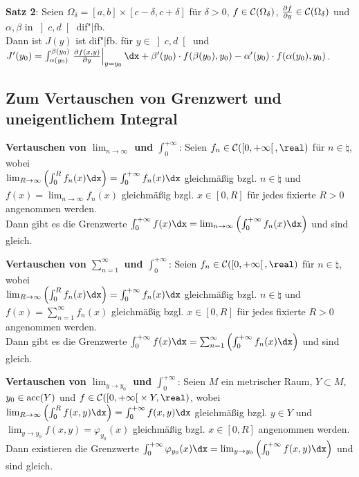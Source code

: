 \textbf{Satz 2}: Seien $\Omega_\delta = [a,b] \times [c - \delta, c + \delta]$
für $\delta > 0$, $f \in \mathcal{C}(\Omega_\delta)$,
$\frac{\partial f}{\partial y} \in \mathcal{C}(\Omega_\delta)$
und $\alpha, \beta$ in $\left]c,d\right[$ dif"|fb. \\
Dann ist $J(y)$ ist dif"|fb. für $y \in \left]c,d\right[$ und \\
$J'(y_0) = \int_{\alpha(y_0)}^{\beta(y_0)}
\left.\frac{\partial f(x, y)}{\partial y}\right|_{y = y_0}\dx +
\beta'(y_0) \cdot f(\beta(y_0), y_0) - \alpha'(y_0) \cdot f(\alpha(y_0), y_0)$.

\subsection{%
    Zum Vertauschen von Grenzwert und uneigentlichem Integral%
}

\textbf{Vertauschen von $\lim_{n \to \infty}$ und $\int_0^{+\infty}$}:
Seien $f_n \in \C(\left[0,+\infty\right[, \real)$ für $n \in \natural$,
wobei \\
$\lim_{R \to \infty} \left(\int_0^R f_n(x)\dx\right) =
\int_0^{+\infty} f_n(x)\dx$ gleichmäßig bzgl. $n \in \natural$ und \\
$f(x) = \lim_{n \to \infty} f_n(x)$ gleichmäßig bzgl. $x \in [0,R]$
für jedes fixierte $R > 0$ angenommen werden. \\
Dann gibt es die Grenzwerte
$\int_0^{+\infty} f(x)\dx =
\lim_{n \to \infty} \left(\int_0^{+\infty} f_n(x)\dx\right)$
und sind gleich.

\textbf{Vertauschen von $\sum_{n=1}^\infty$ und $\int_0^{+\infty}$}:
Seien $f_n \in \C(\left[0,+\infty\right[, \real)$ für $n \in \natural$,
wobei \\
$\lim_{R \to \infty} \left(\int_0^R f_n(x)\dx\right) =
\int_0^{+\infty} f_n(x)\dx$ gleichmäßig bzgl. $n \in \natural$ und \\
$f(x) = \sum_{n=1}^\infty f_n(x)$ gleichmäßig bzgl. $x \in [0,R]$
für jedes fixierte $R > 0$ angenommen werden. \\
Dann gibt es die Grenzwerte
$\int_0^{+\infty} f(x)\dx =
\sum_{n=1}^\infty \left(\int_0^{+\infty} f_n(x)\dx\right)$
und sind gleich.

\textbf{Vertauschen von $\lim_{y \to y_0}$ und $\int_0^{+\infty}$}:
Seien $M$ ein metrischer Raum, $Y \subset M$, $y_0 \in \operatorname{acc}(Y)$ und
$f \in \C(\left[0, +\infty\right[ \times Y, \real)$, wobei \\
$\lim_{R \to \infty} \left(\int_0^R f(x,y)\dx\right) =
\int_0^{+\infty} f(x,y)\dx$ gleichmäßig bzgl. $y \in Y$ und \\
$\lim_{y \to y_0} f(x,y) = \varphi_{y_0}(x)$ gleichmäßig bzgl. $x \in [0,R]$
angenommen werden. \\
Dann existieren die Grenzwerte
$\int_0^{+\infty} \varphi_{y_0}(x)\dx =
\lim_{y \to y_0} \left(\int_0^{+\infty} f(x,y)\dx\right)$ und sind gleich.

